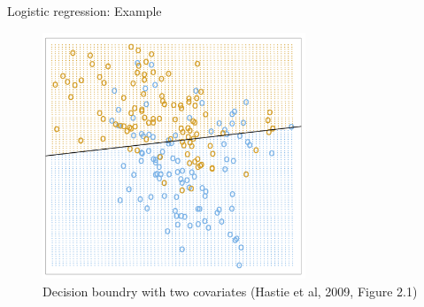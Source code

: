 \documentclass[10pt]{beamer}
\begin{document}
\begin{frame}{Logistic regression: Example}


\begin{figure}[h]
\caption{Decision boundry with two covariates (Hastie et al, 2009, Figure 2.1) }
\centering
\includegraphics[width=0.7\textwidth]{figs/decision_fig_2_1.png}
\end{figure}

\end{frame}
\end{document}
